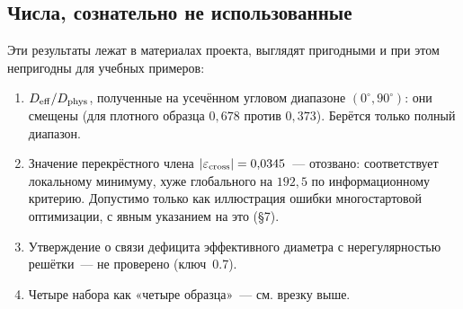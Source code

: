 \subsection*{Числа, сознательно не использованные}

Эти результаты лежат в материалах проекта, выглядят пригодными и при этом непригодны для учебных
примеров:

\begin{enumerate}[leftmargin=1.6em,itemsep=0.3em]
  \item $D_{\mathrm{eff}}/D_{\mathrm{phys}}$, полученные на усечённом угловом диапазоне $(0^\circ,90^\circ)$: они
        смещены (для плотного образца $0{,}678$ против $0{,}373$). Берётся только полный
        диапазон.
  \item Значение перекрёстного члена $|\varepsilon_{\rm cross}|=0{,}0345$~--- отозвано:
        соответствует локальному минимуму, хуже глобального на $192{,}5$ по информационному
        критерию. Допустимо только как иллюстрация ошибки многостартовой оптимизации, с явным
        указанием на это (§7).
  \item Утверждение о связи дефицита эффективного диаметра с нерегулярностью решётки~--- не
        проверено (ключ~0.7).
  \item Четыре набора  как «четыре образца»~--- см. врезку выше.
\end{enumerate}
